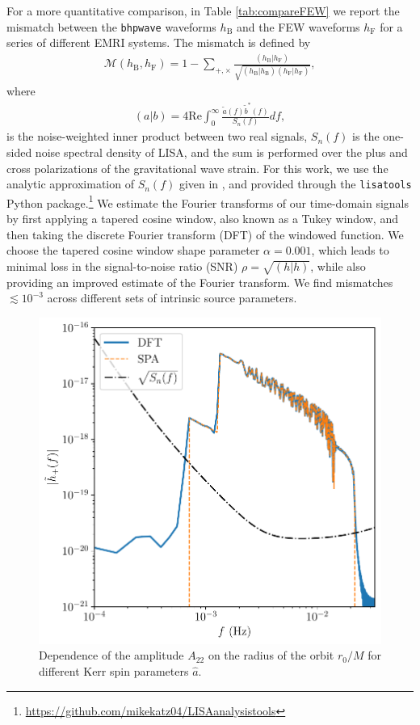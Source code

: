 \documentclass[%
 reprint,
 nofootinbib,
 amsmath,amssymb,
 aps,
 prd,
]{revtex4-2}
\begin{document}
For a more quantitative comparison, in Table \ref{tab:compareFEW} we report the mismatch between the \texttt{bhpwave} waveforms $h_\mathrm{B}$ and the FEW waveforms $h_\mathrm{F}$ for a series of different EMRI systems. The mismatch is defined by
\begin{align}
    \mathcal{M}(h_\mathrm{B}, h_\mathrm{F}) = 1 - \sum_{+,\times} \frac{\left(h_\mathrm{B} | h_\mathrm{F} \right)}{\sqrt{\left(h_\mathrm{B} | h_\mathrm{B} \right)\left(h_\mathrm{F} | h_\mathrm{F} \right)}},
\end{align}
where 
\begin{align}
    \left(a | b \right) = 4 \mathrm{Re} \int_0^\infty \frac{\tilde{a}(f)\tilde{b}^*(f)}{S_n(f)}df,
\end{align}
is the noise-weighted inner product between two real signals, $S_n(f)$ is the one-sided noise spectral density of LISA, and the sum is performed over the plus and cross polarizations of the gravitational wave strain. For this work, we use the analytic approximation of $S_n(f)$ given in \cite{RobsCornLiu19}, and provided through the \texttt{lisatools} Python package.\footnote{\href{https://github.com/mikekatz04/LISAanalysistools}{https://github.com/mikekatz04/LISAanalysistools}} We estimate the Fourier transforms of our time-domain signals by first applying a tapered cosine window, also known as a Tukey window, and then taking the discrete Fourier transform (DFT) of the windowed function. We choose the tapered cosine window shape parameter $\alpha = 0.001$, which leads to minimal loss in the signal-to-noise ratio (SNR) $\rho = \sqrt{(h|h)}$, while also providing an improved estimate of the Fourier transform. We find mismatches $\lesssim 10^{-3}$ across different sets of intrinsic source parameters.

\begin{figure}[!htp]
    \centering
    \includegraphics[width=0.98\linewidth]{figures/dft_comparison.pdf}
    \caption{Dependence of the amplitude $A_{22}$ on the radius of the orbit $r_0/M$ for different Kerr spin parameters $\hat{a}$.}
    \label{fig:dft}
\end{figure}
\end{document}
